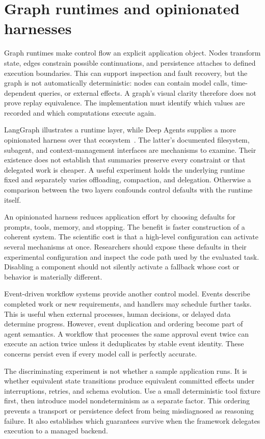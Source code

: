 \section{Graph runtimes and opinionated harnesses}\label{sec:C22:graphs}
Graph runtimes make control flow an explicit application object. Nodes transform state, edges constrain possible continuations, and persistence attaches to defined execution boundaries. This can support inspection and fault recovery, but the graph is not automatically deterministic: nodes can contain model calls, time-dependent queries, or external effects. A graph's visual clarity therefore does not prove replay equivalence. The implementation must identify which values are recorded and which computations execute again.

LangGraph illustrates a runtime layer, while Deep Agents supplies a more opinionated harness over that ecosystem~\cite{executionproduct001,executionproduct006}. The latter's documented filesystem, subagent, and context-management interfaces are mechanisms to examine. Their existence does not establish that summaries preserve every constraint or that delegated work is cheaper. A useful experiment holds the underlying runtime fixed and separately varies offloading, compaction, and delegation. Otherwise a comparison between the two layers confounds control defaults with the runtime itself.

An opinionated harness reduces application effort by choosing defaults for prompts, tools, memory, and stopping. The benefit is faster construction of a coherent system. The scientific cost is that a high-level configuration can activate several mechanisms at once. Researchers should expose these defaults in their experimental configuration and inspect the code path used by the evaluated task. Disabling a component should not silently activate a fallback whose cost or behavior is materially different.

Event-driven workflow systems provide another control model. Events describe completed work or new requirements, and handlers may schedule further tasks. This is useful when external processes, human decisions, or delayed data determine progress. However, event duplication and ordering become part of agent semantics. A workflow that processes the same approval event twice can execute an action twice unless it deduplicates by stable event identity. These concerns persist even if every model call is perfectly accurate.

The discriminating experiment is not whether a sample application runs. It is whether equivalent state transitions produce equivalent committed effects under interruptions, retries, and schema evolution. Use a small deterministic tool fixture first, then introduce model nondeterminism as a separate factor. This ordering prevents a transport or persistence defect from being misdiagnosed as reasoning failure. It also establishes which guarantees survive when the framework delegates execution to a managed backend.

